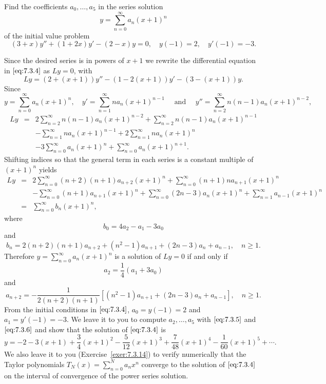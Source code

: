 \documentclass{ximera}
\begin{document}
\begin{example}\label{example:7.3.2}
Find  the coefficients $a_0, \dots, a_5$ in the series
solution
$$
y=\sum^\infty_{n=0} a_n(x+1)^n
$$
 of the initial value problem
\begin{equation} \label{eq:7.3.4}
(3+x)y''+(1+2x)y'-(2-x)y=0,\quad y(-1)=2,\quad y'(-1)=-3.
\end{equation}
\begin{explanation}
Since the desired series is in powers of $x+1$ we rewrite
the differential equation in $\eqref{eq:7.3.4}$ as $Ly=0$, with
$$
Ly=\left(2+(x+1)\right)y''-\left(1-2(x+1)\right)y'-\left(3-(x+1)\right)y.
$$
Since
$$
y=\sum^\infty_{n=0} a_n(x+1)^n,\quad y'=\sum^\infty_{n=1} n
a_n(x+1)^{n-1}\quad\mbox{ and }\quad
y''=\sum^\infty_{n=2}n(n-1)a_n(x+1)^{n-2},
$$
\begin{eqnarray*}
Ly&=&2\sum^\infty_{n=2}n(n-1)a_n(x+1)^{n-2}+\sum^\infty_{n=2}n(n-1)a_n(x+1)^{n-1}
\\&&-\sum^\infty_{n=1}na_n(x+1)^{n-1}+2\sum^\infty_{n=1}na_n(x+1)^n\\
&&-3\sum^\infty_{n=0}a_n(x+1)^n+\sum_{n=0}^\infty a_n(x+1)^{n+1}.
\end{eqnarray*}
Shifting indices so that  the general term in each
series is a constant multiple of $(x+1)^n$ yields
\begin{eqnarray*}
Ly&=&2\sum^\infty_{n=0}(n+2)(n+1)a_{n+2}(x+1)^n+\sum^\infty_{n=0}(n+1)na_{n+1}
(x+1)^n\\&&-\sum^\infty_{n=0}(n+1)a_{n+1}(x+1)^n
+\sum^\infty_{n=0}(2n-3)a_n(x+1)^n+\sum^\infty_{n=1}a_{n-1}(x+1)^n\\
&=&\sum^\infty_{n=0}b_n(x+1)^n,
\end{eqnarray*}
where
$$
b_0=4a_2-a_1-3a_0
$$
and
$$
b_n=2(n+2)(n+1)a_{n+2}+(n^2-1)a_{n+1}+(2n-3)a_n+a_{n-1},\quad n\geq1.
$$
Therefore $y=\sum^\infty_{n=0}a_n(x+1)^n$ is a solution of $Ly=0$
if and only if
\begin{equation} \label{eq:7.3.5}
a_2=\frac{1}{4}(a_1+3a_0)
\end{equation}
and
\begin{equation} \label{eq:7.3.6}
a_{n+2}=-\frac{1}{2(n+2)(n+1)}\left[(n^2-1)a_{n+1}+(2n-3)a_n+a_{n-1}\right],
\quad n\geq1.
\end{equation}
From the initial conditions in $\eqref{eq:7.3.4}$, $a_0=y(-1)=2$ and
$a_1=y'(-1)=-3$. We leave it to you to  compute $a_2, \dots, a_5$
with $\eqref{eq:7.3.5}$ and $\eqref{eq:7.3.6}$ and show that
the solution of $\eqref{eq:7.3.4}$ is
$$
y=-2-3(x+1)+\frac{3}{4}(x+1)^2-\frac{5}{12}(x+1)^3+\frac{7}{48}(x+1)^4
-\frac{1}{60}(x+1)^5+\cdots.
$$
We also leave it to you (Exercise~\ref{exer:7.3.14}) 
to verify numerically
that the Taylor polynomials $T_N(x)=\sum_{n=0}^Na_nx^n$ converge to the solution of $\eqref{eq:7.3.4}$ on the interval of convergence of the power series solution.
\end{explanation}
\end{example}
\end{document}
